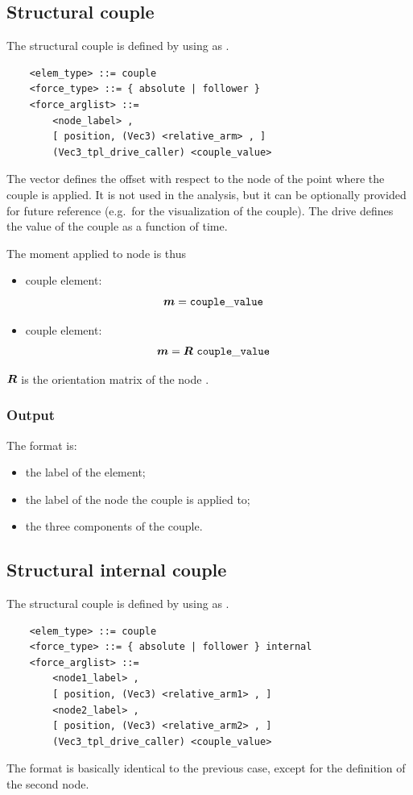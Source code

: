 \subsection{Structural couple}
The structural couple is defined by using  as .
\begin{verbatim}
    <elem_type> ::= couple
    <force_type> ::= { absolute | follower } 
    <force_arglist> ::=
        <node_label> ,
        [ position, (Vec3) <relative_arm> , ]
        (Vec3_tpl_drive_caller) <couple_value>
\end{verbatim}
The vector  defines the offset with respect
to the node of the point where the couple is applied.
It is not used in the analysis, but it can be optionally provided
for future reference (e.g.\ for the visualization of the couple).
The drive  defines the value of the couple
as a function of time.

The moment applied to node  is thus
\begin{itemize}
\item {} couple element:
\begin{align}
	\boldsymbol{m} & = \mathtt{couple\_value}
\end{align}

\item {} couple element:
\begin{align}
	\boldsymbol{m} & = \boldsymbol{R} \ \mathtt{couple\_value}
\end{align}
\end{itemize}
$\boldsymbol{R}$ is the orientation matrix of the node .

\subsubsection{Output}
The format is:
\begin{itemize}
    \item the label of the element;
    \item the label of the node the couple is applied to;
    \item the three components of the couple.
\end{itemize}

\subsection{Structural internal couple}
The structural couple is defined by using  as .
\begin{verbatim}
    <elem_type> ::= couple
    <force_type> ::= { absolute | follower } internal
    <force_arglist> ::=
        <node1_label> ,
        [ position, (Vec3) <relative_arm1> , ]
        <node2_label> ,
        [ position, (Vec3) <relative_arm2> , ]
        (Vec3_tpl_drive_caller) <couple_value>
\end{verbatim}
The format is basically identical to the previous case,
except for the definition of the second node.

